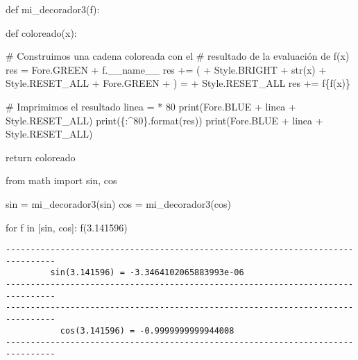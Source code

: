 \documentclass[
  letterpaper,
  DIV=11,
  numbers=noendperiod]{scrreprt}
\newenvironment{Shaded}{\begin{snugshade}}{\end{snugshade}}
\newcommand{\BuiltInTok}[1]{\textcolor[rgb]{0.00,0.23,0.31}{#1}}
\newcommand{\CommentTok}[1]{\textcolor[rgb]{0.37,0.37,0.37}{#1}}
\newcommand{\ControlFlowTok}[1]{\textcolor[rgb]{0.00,0.23,0.31}{#1}}
\newcommand{\DecValTok}[1]{\textcolor[rgb]{0.68,0.00,0.00}{#1}}
\newcommand{\FloatTok}[1]{\textcolor[rgb]{0.68,0.00,0.00}{#1}}
\newcommand{\ImportTok}[1]{\textcolor[rgb]{0.00,0.46,0.62}{#1}}
\newcommand{\KeywordTok}[1]{\textcolor[rgb]{0.00,0.23,0.31}{#1}}
\newcommand{\NormalTok}[1]{\textcolor[rgb]{0.00,0.23,0.31}{#1}}
\newcommand{\OperatorTok}[1]{\textcolor[rgb]{0.37,0.37,0.37}{#1}}
\newcommand{\SpecialCharTok}[1]{\textcolor[rgb]{0.37,0.37,0.37}{#1}}
\newcommand{\SpecialStringTok}[1]{\textcolor[rgb]{0.13,0.47,0.30}{#1}}
\newcommand{\StringTok}[1]{\textcolor[rgb]{0.13,0.47,0.30}{#1}}
\newcommand{\VariableTok}[1]{\textcolor[rgb]{0.07,0.07,0.07}{#1}}
\begin{document}
\begin{Shaded}
\begin{Highlighting}[]
\KeywordTok{def}\NormalTok{ mi\_decorador3(f):}

    \KeywordTok{def}\NormalTok{ coloreado(x):}

        \CommentTok{\# Construimos una cadena coloreada con el }
        \CommentTok{\# resultado de la evaluación de f(x)}
\NormalTok{        res }\OperatorTok{=}\NormalTok{ Fore.GREEN }\OperatorTok{+}\NormalTok{ f.}\VariableTok{\_\_name\_\_} 
\NormalTok{        res }\OperatorTok{+=} \StringTok{\textquotesingle{}(\textquotesingle{}} \OperatorTok{+}\NormalTok{ Style.BRIGHT }\OperatorTok{+} \BuiltInTok{str}\NormalTok{(x) }\OperatorTok{+}\NormalTok{ Style.RESET\_ALL }\OperatorTok{+}\NormalTok{ Fore.GREEN }\OperatorTok{+} \StringTok{\textquotesingle{}) = \textquotesingle{}} \OperatorTok{+}\NormalTok{ Style.RESET\_ALL}
\NormalTok{        res }\OperatorTok{+=} \SpecialStringTok{f\textquotesingle{}}\SpecialCharTok{\{}\NormalTok{f(x)}\SpecialCharTok{\}}\SpecialStringTok{\textquotesingle{}}

        \CommentTok{\# Imprimimos el resultado}
\NormalTok{        linea }\OperatorTok{=} \StringTok{\textquotesingle{}{-}\textquotesingle{}} \OperatorTok{*} \DecValTok{80}
        \BuiltInTok{print}\NormalTok{(Fore.BLUE }\OperatorTok{+}\NormalTok{ linea }\OperatorTok{+}\NormalTok{ Style.RESET\_ALL)}
        \BuiltInTok{print}\NormalTok{(}\StringTok{\textquotesingle{}}\SpecialCharTok{\{:\^{}80\}}\StringTok{\textquotesingle{}}\NormalTok{.}\BuiltInTok{format}\NormalTok{(res))}
        \BuiltInTok{print}\NormalTok{(Fore.BLUE }\OperatorTok{+}\NormalTok{ linea }\OperatorTok{+}\NormalTok{ Style.RESET\_ALL)}

    \ControlFlowTok{return}\NormalTok{ coloreado}

\ImportTok{from}\NormalTok{ math }\ImportTok{import}\NormalTok{ sin, cos}

\NormalTok{sin }\OperatorTok{=}\NormalTok{ mi\_decorador3(sin)}
\NormalTok{cos }\OperatorTok{=}\NormalTok{ mi\_decorador3(cos)}

\ControlFlowTok{for}\NormalTok{ f }\KeywordTok{in}\NormalTok{ [sin, cos]:}
\NormalTok{    f(}\FloatTok{3.141596}\NormalTok{)}
\end{Highlighting}
\end{Shaded}

\begin{verbatim}
--------------------------------------------------------------------------------
         sin(3.141596) = -3.3464102065883993e-06          
--------------------------------------------------------------------------------
--------------------------------------------------------------------------------
           cos(3.141596) = -0.9999999999944008            
--------------------------------------------------------------------------------
\end{verbatim}
\end{document}

